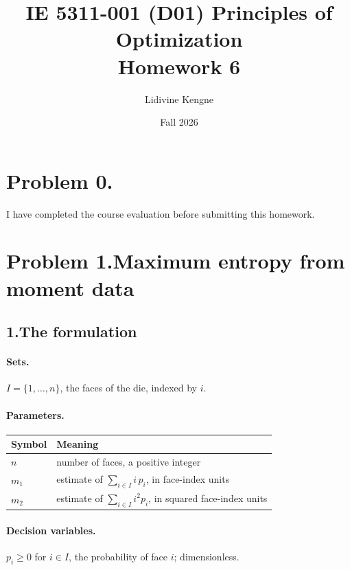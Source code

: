 \documentclass[11pt]{article}
\title{IE 5311-001 (D01) Principles of Optimization\\
       Homework 6}
\author{Lidivine Kengne}
\date{Fall 2026}
\theoremstyle{definition}
\begin{document}
\maketitle

\section*{Problem 0.}

I have completed the course evaluation before submitting this homework.

\section*{Problem 1.\quad Maximum entropy from moment data \quad[25 pts]}

\subsection*{1.\quad The formulation}

\paragraph{Sets.} $I = \{1,\dots,n\}$, the faces of the die, indexed by
$i$.

\paragraph{Parameters.}
\begin{center}
\begin{tabular}{@{}ll@{}}
\toprule
Symbol & Meaning\\
\midrule
$n$ & number of faces, a positive integer\\
$m_1$ & estimate of $\sum_{i \in I} i\,p_i$, in face-index units\\
$m_2$ & estimate of $\sum_{i \in I} i^2 p_i$, in squared face-index units\\
\bottomrule
\end{tabular}
\end{center}

\paragraph{Decision variables.} $p_i \ge 0$ for $i \in I$, the
probability of face $i$; dimensionless.
\end{document}
